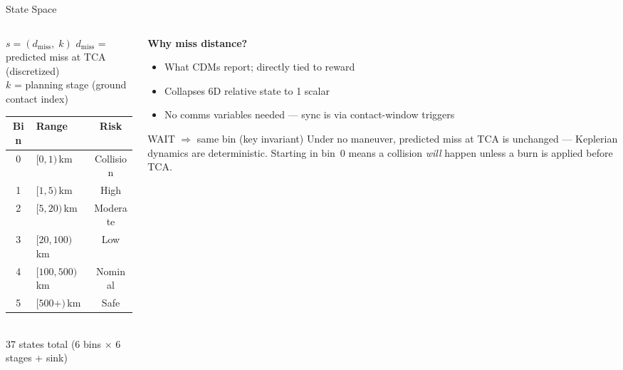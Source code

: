 \documentclass[aspectratio=169]{beamer}
\newcommand{\good}[1]{\textcolor{green!60!black}{#1}}
\newcommand{\bad}[1]{\textcolor{red!70!black}{#1}}
\begin{document}
\begin{frame}{State Space}
  \begin{columns}
    \begin{column}{0.42\textwidth}
      \begin{block}{$s = (d_\text{miss},\; k)$}
        $d_\text{miss}$ = predicted miss at TCA (discretized)\\
        $k$ = planning stage (ground contact index)
      \end{block}
      \vspace{0.4em}
      \begin{tabular}{clc}
        \toprule
        Bin & Range & Risk \\
        \midrule
        0 & $[0, 1)$\,km   & \bad{Collision} \\
        1 & $[1, 5)$\,km   & \bad{High} \\
        2 & $[5, 20)$\,km  & Moderate \\
        3 & $[20, 100)$\,km & Low \\
        4 & $[100, 500)$\,km & Nominal \\
        5 & $[500+)$\,km   & \good{Safe} \\
        \bottomrule
      \end{tabular}\\[0.3em]
      \small 37 states total (6 bins $\times$ 6 stages + sink)
    \end{column}
    \begin{column}{0.55\textwidth}
      \textbf{Why miss distance?}
      \begin{itemize}
        \item What CDMs report; directly tied to reward
        \item Collapses 6D relative state to 1 scalar
        \item No comms variables needed --- sync is via contact-window triggers
      \end{itemize}
      \vspace{0.5em}
      \begin{alertblock}{WAIT $\Rightarrow$ same bin (key invariant)}
        Under no maneuver, predicted miss at TCA is unchanged --- Keplerian dynamics are deterministic. Starting in bin~0 means a collision \emph{will} happen unless a burn is applied before TCA.
      \end{alertblock}
    \end{column}
  \end{columns}
\end{frame}
\end{document}
